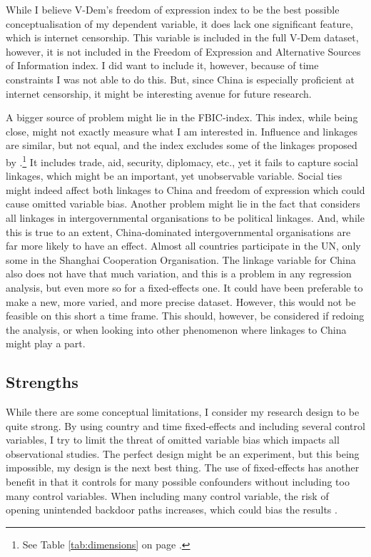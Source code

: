 While I believe V-Dem's freedom of expression index to be the best possible conceptualisation of my dependent variable, it does lack one significant feature, which is internet censorship. This variable is included in the full V-Dem dataset, however, it is not included in the Freedom of Expression and Alternative Sources of Information index. I did want to include it, however, because of time constraints I was not able to do this. But, since China is especially proficient at internet censorship, it might be interesting avenue for future research.

A bigger source of problem might lie in the FBIC-index. This index, while being close, might not exactly measure what I am interested in. Influence and linkages are similar, but not equal, and the index excludes some of the linkages proposed by \citet{levitsky_competitive_2010}.\footnote{See Table \ref{tab:dimensions} on page \pageref{tab:dimensions}.} It includes trade, aid, security, diplomacy, etc., yet it fails to capture social linkages, which might be an important, yet unobservable variable. Social ties might indeed affect both linkages to China and freedom of expression which could cause omitted variable bias. Another problem might lie in the fact that \citep{moyer_china-us_2021} considers all linkages in intergovernmental organisations to be political linkages. And, while this is true to an extent, China-dominated intergovernmental organisations are far more likely to have an effect. Almost all countries participate in the UN, only some in the Shanghai Cooperation Organisation. The linkage variable for China also does not have that much variation, and this is a problem in any regression analysis, but even more so for a fixed-effects one. It could have been preferable to make a new, more varied, and more precise dataset. However, this would not be feasible on this short a time frame. This should, however, be considered if redoing the analysis, or when looking into other phenomenon where linkages to China might play a part.

\subsection{Strengths}
While there are some conceptual limitations, I consider my research design to be quite strong. By using country and time fixed-effects and including several control variables, I try to limit the threat of omitted variable bias which impacts all observational studies. The perfect design might be an experiment, but this being impossible, my design is the next best thing. The use of fixed-effects has another benefit in that it controls for many possible confounders without including too many control variables. When including many control variable, the risk of opening unintended backdoor paths increases, which could bias the results \citep[Chapter 3]{cunningham_causal_2021}.

